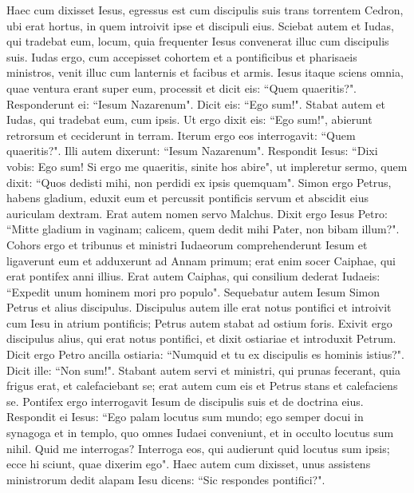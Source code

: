 \begin{biblechapter} 
\verse Haec cum dixisset Iesus, egressus est cum discipulis suis trans torrentem Cedron, ubi erat hortus, in quem introivit ipse et discipuli eius. 
\verse Sciebat autem et Iudas, qui tradebat eum, locum, quia frequenter Iesus convenerat illuc cum discipulis suis. 
\verse Iudas ergo, cum accepisset cohortem et a pontificibus et pharisaeis ministros, venit illuc cum lanternis et facibus et armis. 
\verse Iesus itaque sciens omnia, quae ventura erant super eum, processit et dicit eis: “Quem quaeritis?". 
\verse Responderunt ei: “Iesum Nazarenum". Dicit eis: “Ego sum!". Stabat autem et Iudas, qui tradebat eum, cum ipsis. 
\verse Ut ergo dixit eis: “Ego sum!", abierunt retrorsum et ceciderunt in terram. 
\verse Iterum ergo eos interrogavit: “Quem quaeritis?". Illi autem dixerunt: “Iesum Nazarenum". 
\verse Respondit Iesus: “Dixi vobis: Ego sum! Si ergo me quaeritis, sinite hos abire", 
\verse ut impleretur sermo, quem dixit: “Quos dedisti mihi, non perdidi ex ipsis quemquam". 
\verse Simon ergo Petrus, habens gladium, eduxit eum et percussit pontificis servum et abscidit eius auriculam dextram. Erat autem nomen servo Malchus. 
\verse Dixit ergo Iesus Petro: “Mitte gladium in vaginam; calicem, quem dedit mihi Pater, non bibam illum?". 
\verse Cohors ergo et tribunus et ministri Iudaeorum comprehenderunt Iesum et ligaverunt eum 
\verse et adduxerunt ad Annam primum; erat enim socer Caiphae, qui erat pontifex anni illius. 
\verse Erat autem Caiphas, qui consilium dederat Iudaeis: “Expedit unum hominem mori pro populo". 
\verse Sequebatur autem Iesum Simon Petrus et alius discipulus. Discipulus autem ille erat notus pontifici et introivit cum Iesu in atrium pontificis; 
\verse Petrus autem stabat ad ostium foris. Exivit ergo discipulus alius, qui erat notus pontifici, et dixit ostiariae et introduxit Petrum. 
\verse Dicit ergo Petro ancilla ostiaria: “Numquid et tu ex discipulis es hominis istius?". Dicit ille: “Non sum!". 
\verse Stabant autem servi et ministri, qui prunas fecerant, quia frigus erat, et calefaciebant se; erat autem cum eis et Petrus stans et calefaciens se. 
\verse Pontifex ergo interrogavit Iesum de discipulis suis et de doctrina eius.  
\verse Respondit ei Iesus: “Ego palam locutus sum mundo; ego semper docui in synagoga et in templo, quo omnes Iudaei conveniunt, et in occulto locutus sum nihil. 
\verse Quid me interrogas? Interroga eos, qui audierunt quid locutus sum ipsis; ecce hi sciunt, quae dixerim ego". 
\verse Haec autem cum dixisset, unus assistens ministrorum dedit alapam Iesu dicens: “Sic respondes pontifici?". 

\end{biblechapter}
